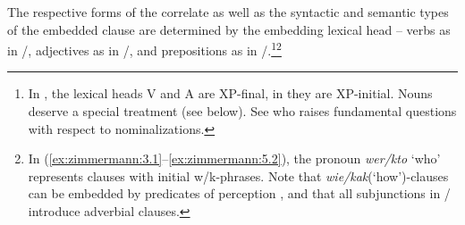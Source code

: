 \documentclass[output=paper]{langscibook}
\begin{document}
The respective forms of the correlate as well as the syntactic and semantic types of the embedded clause are determined by the embedding lexical head -- verbs as in /, adjectives as in /, and prepositions as in /.\footnote{In , the lexical heads V and A are XP-final, in  they are XP-initial. Nouns deserve a special treatment (see below). See \citet{Knjazev2016} who raises fundamental questions with respect to nominalizations.}\footnote{In (\ref{ex:zimmermann:3.1}--\ref{ex:zimmermann:5.2}), the pronoun \textit{wer/kto} `who' represents clauses with initial w/k-phrases. Note that \textit{wie/kak}(`how')-clauses can be embedded by predicates of perception \citep[see][]{Zimmermann1991}, and that all subjunctions in / introduce adverbial clauses.}
\end{document}
